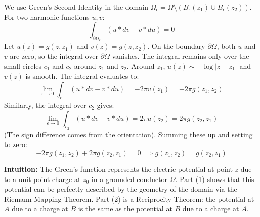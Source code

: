 \begin{solution}
\begin{enumerate}
    We use Green's Second Identity in the domain $\Omega_\epsilon = \Omega \setminus (B_\epsilon(z_1) \cup B_\epsilon(z_2))$. For two harmonic functions $u, v$:
    \[
    \int_{\partial\Omega_\epsilon} (u *dv - v *du) = 0
    \]
    Let $u(z) = g(z, z_1)$ and $v(z) = g(z, z_2)$.
    On the boundary $\partial\Omega$, both $u$ and $v$ are zero, so the integral over $\partial\Omega$ vanishes.
    The integral remains only over the small circles $c_1$ and $c_2$ around $z_1$ and $z_2$.
    Around $z_1$, $u(z) \sim -\log|z-z_1|$ and $v(z)$ is smooth. The integral evaluates to:
    \[
    \lim_{\epsilon\to 0} \int_{c_1} (u *dv - v *du) = -2\pi v(z_1) = -2\pi g(z_1, z_2)
    \]
    Similarly, the integral over $c_2$ gives:
    \[
    \lim_{\epsilon\to 0} \int_{c_2} (u *dv - v *du) = 2\pi u(z_2) = 2\pi g(z_2, z_1)
    \]
    (The sign difference comes from the orientation).
    Summing these up and setting to zero:
    \[
    -2\pi g(z_1, z_2) + 2\pi g(z_2, z_1) = 0 \implies g(z_1, z_2) = g(z_2, z_1)
    \]
\end{enumerate}

\par\vspace{\baselineskip}
\textbf{Intuition:} 
The Green's function represents the electric potential at point $z$ due to a unit point charge at $z_0$ in a grounded conductor $\Omega$. Part (1) shows that this potential can be perfectly described by the geometry of the domain via the Riemann Mapping Theorem. Part (2) is a Reciprocity Theorem: the potential at $A$ due to a charge at $B$ is the same as the potential at $B$ due to a charge at $A$.
\end{solution}
